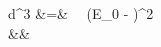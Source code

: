 


\bea
\textrm{d}^3 \Gamma
&=& 
 \, \FF \, \pe \Ee (E_0 - \Ee)^2 \dEe \, \dOmegae \, \xi \nonumber\\ 
&& \times {}
\label{equation:proto_master_jtw}
\eea
